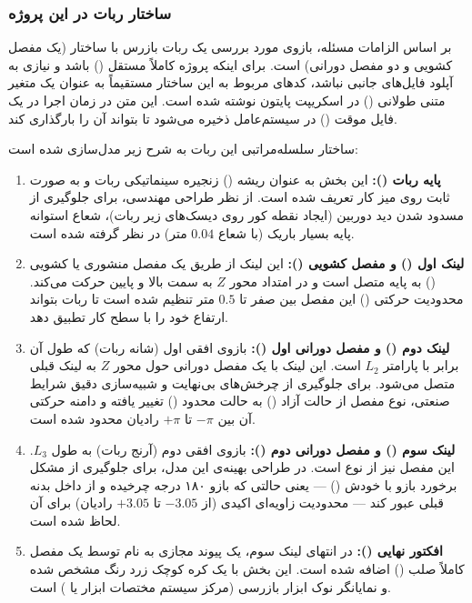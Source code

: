 \documentclass{article}
\begin{document}
\subsubsection*{ساختار ربات  در این پروژه}
بر اساس الزامات مسئله، بازوی مورد بررسی یک ربات بازرس با ساختار  (یک مفصل کشویی و دو مفصل دورانی) است. برای اینکه پروژه کاملاً مستقل () باشد و نیازی به آپلود فایل‌های جانبی نباشد، کدهای  مربوط به این ساختار مستقیماً به عنوان یک متغیر متنی طولانی () در اسکریپت پایتون نوشته شده است. این متن در زمان اجرا در یک فایل موقت () در سیستم‌عامل ذخیره می‌شود تا  بتواند آن را بارگذاری کند.

ساختار سلسله‌مراتبی این ربات به شرح زیر مدل‌سازی شده است:
\begin{enumerate}
	\item \textbf{پایه ربات ():} این بخش به عنوان ریشه () زنجیره سینماتیکی ربات و به صورت ثابت روی میز کار تعریف شده است. از نظر طراحی مهندسی، برای جلوگیری از مسدود شدن دید دوربین (ایجاد نقطه کور روی دیسک‌های زیر ربات)، شعاع استوانه پایه بسیار باریک (با شعاع $0.04$ متر) در نظر گرفته شده است.
	
	\item \textbf{لینک اول () و مفصل کشویی ():} این لینک از طریق یک مفصل منشوری یا کشویی () به پایه متصل است و در امتداد محور $Z$ به سمت بالا و پایین حرکت می‌کند. محدودیت حرکتی () این مفصل بین صفر تا $0.5$ متر تنظیم شده است تا ربات بتواند ارتفاع خود را با سطح کار تطبیق دهد.
	
	\item \textbf{لینک دوم () و مفصل دورانی اول ():} بازوی افقی اول (شانه ربات) که طول آن برابر با پارامتر $L_2$ است. این لینک با یک مفصل دورانی حول محور $Z$ به لینک قبلی متصل می‌شود. برای جلوگیری از چرخش‌های بی‌نهایت و شبیه‌سازی دقیق شرایط صنعتی، نوع مفصل از حالت آزاد () به حالت محدود () تغییر یافته و دامنه حرکتی آن بین $-\pi$ تا $+\pi$ رادیان محدود شده است.
	
	\item \textbf{لینک سوم () و مفصل دورانی دوم ():} بازوی افقی دوم (آرنج ربات) به طول $L_3$. این مفصل نیز از نوع  است. در طراحی بهینه‌ی این مدل، برای جلوگیری از مشکل برخورد بازو با خودش () — یعنی حالتی که بازو ۱۸۰ درجه چرخیده و از داخل بدنه قبلی عبور کند — محدودیت زاویه‌ای اکیدی (از $-3.05$ تا $+3.05$ رادیان) برای آن لحاظ شده است.
	
	\item \textbf{افکتور نهایی ():} در انتهای لینک سوم، یک پیوند مجازی به نام  توسط یک مفصل کاملاً صلب () اضافه شده است. این بخش با یک کره کوچک زرد رنگ مشخص شده و نمایانگر نوک ابزار بازرسی (مرکز سیستم مختصات ابزار یا ) است.
\end{enumerate}
\end{document}
